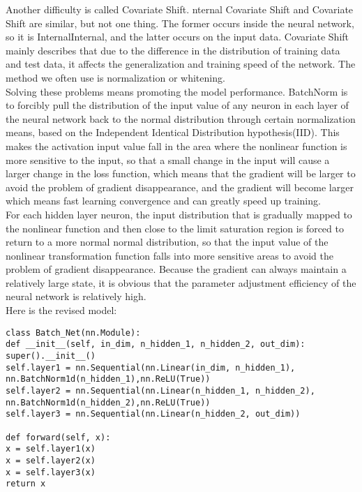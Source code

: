 \documentclass{article}
\begin{document}
Another difficulty is called Covariate Shift. nternal Covariate Shift and Covariate Shift are similar, but not one thing. The former occurs inside the neural network, so it is InternalInternal, and the latter occurs on the input data. 
Covariate Shift mainly describes that due to the difference in the distribution of training data and test data, it affects the generalization and training speed of the network. The method we often use is normalization or whitening.\\

Solving these problems means promoting the model performance. BatchNorm is to forcibly pull the distribution of the input value of any neuron in each layer of the neural network back to the normal distribution through certain normalization means, based on the Independent Identical Distribution hypothesis(IID). This makes the activation input value fall in the area where the nonlinear function is more sensitive to the input, so that a small change in the input will cause a larger change in the loss function, which means that the gradient will be larger to avoid the problem of gradient disappearance, and the gradient will become larger which means fast learning convergence and can greatly speed up training.\\

For each hidden layer neuron, the input distribution that is gradually mapped to the nonlinear function and then close to the limit saturation region is forced to return to a more normal normal distribution, so that the input value of the nonlinear transformation function falls into more sensitive areas to avoid the problem of gradient disappearance. 
Because the gradient can always maintain a relatively large state, it is obvious that the parameter adjustment efficiency of the neural network is relatively high.\\

Here is the revised model:
\begin{verbatim}
class Batch_Net(nn.Module):
def __init__(self, in_dim, n_hidden_1, n_hidden_2, out_dim):
super().__init__()
self.layer1 = nn.Sequential(nn.Linear(in_dim, n_hidden_1),
nn.BatchNorm1d(n_hidden_1),nn.ReLU(True))
self.layer2 = nn.Sequential(nn.Linear(n_hidden_1, n_hidden_2),
nn.BatchNorm1d(n_hidden_2),nn.ReLU(True))
self.layer3 = nn.Sequential(nn.Linear(n_hidden_2, out_dim))

def forward(self, x):
x = self.layer1(x)
x = self.layer2(x)
x = self.layer3(x)
return x
\end{verbatim}
\end{document}
